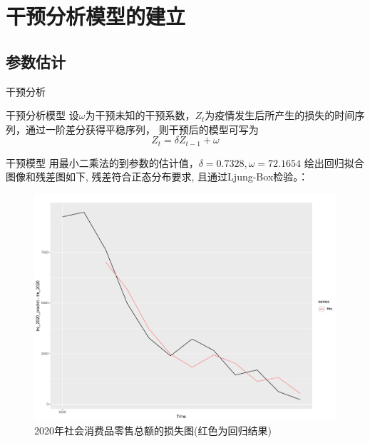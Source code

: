 \documentclass[10pt]{beamer}
\begin{document}
\section{干预分析模型的建立}

\subsection{参数估计}
\begin{frame}{干预分析}
  \begin{block}{干预分析模型}
    设\(\omega\)为干预未知的干预系数，\(Z_t\)为疫情发生后所产生的损失的时间序列，通过一阶差分获得平稳序列，
    则干预后的模型可写为
    \[Z_t = \delta Z_{t-1} + \omega\]
  \end{block}
\end{frame}

\begin{frame}{干预模型}
  用最小二乘法的到参数的估计值，\(\delta =0.7328 , \omega =  72.1654 \)
  绘出回归拟合图像和残差图如下, 残差符合正态分布要求, 且通过Ljung-Box检验。：
  \begin{figure}[H] %
    \centering %
    \begin{minipage}[t]{0.48\textwidth}
      \centering
      \includegraphics[width=1\textwidth]{figures/fitted_loss_2020.pdf} %
      \caption{2020年社会消费品零售总额的损失图(红色为回归结果)} %
      \label{fitted_loss_2020} %
    \end{minipage}
    \begin{minipage}[t]{0.48\textwidth}

\end{minipage}
\end{figure}
\end{frame}
\end{document}
